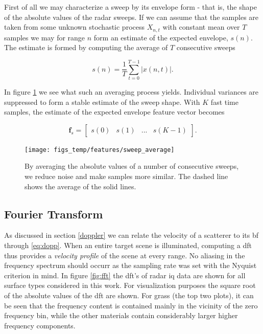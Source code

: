 First of all we may characterize a sweep by its envelope form - that is, the shape of the absolute values of the radar sweeps. If we can assume that the samples are taken from some unknown stochastic process $X_{n,t}$ with constant mean over $T$ samples we may for range $n$ form an estimate of the expected envelope, $s(n)$. The estimate is formed by computing the average of $T$ consecutive sweeps

\begin{equation}
	s(n) = \frac{1}{T}\sum_{t=0}^{T-1}|x(n, t)|.
\end{equation}

In figure \ref{fig:sweep_average} we see what such an averaging process yields. Individual variances are suppressed to form a stable estimate of the sweep shape. With $K$ fast time samples, the estimate of the expected envelope feature vector becomes 

\begin{equation}
	\mathbf{f}_{s} = 
	\begin{bmatrix}
		s(0) & s(1) & ... & s(K-1)
	\end{bmatrix}.
\end{equation}


\begin{figure}[h]
	\centering
	\texttt{[image: figs\_temp/features/sweep\_average]}
	\caption{By averaging the absolute values of a number of consecutive sweeps, we reduce noise and make samples more similar. The dashed line shows the average of the solid lines. }
	\label{fig:sweep_average}
\end{figure}


\subsection{Fourier Transform}

As discussed in section \ref{doppler} we can relate the velocity of a scatterer to its \gls{bf} through \ref{eq:dopp}. When an entire target scene is illuminated, computing a \gls{dft} thus provides a \emph{velocity profile} of the scene at every range. No aliasing in the frequency spectrum should occurr as the sampling rate was set with the Nyquist criterion in mind. In figure \ref{fig:fft} the \gls{dft}'s of radar \gls{iq} data are shown for all surface types considered in this work. For visualization purposes the square root of the absolute values of the \gls{dft} are shown. For grass (the top two plots), it can be seen that the frequency content is contained mainly in the vicinity of the zero frequency bin, while the other materials contain considerably larger higher frequency components. %


